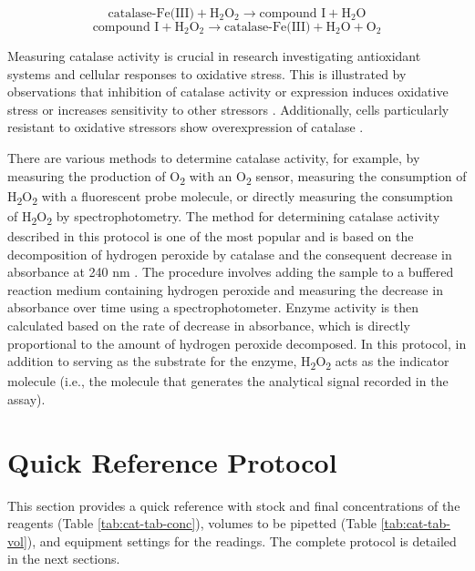 \documentclass[
  9pt,
  american,
  a5paper,
  extrafontsizes,onecolumn,openright
  ]{memoir}
\begin{document}
\[
\text{catalase-Fe(III)} + \text{H}_2\text{O}_2 \rightarrow \text{compound I} + \text{H}_2\text{O}
\]
\[
\text{compound I} + \text{H}_2\text{O}_2 \rightarrow \text{catalase-Fe(III)} + \text{H}_2\text{O} + \text{O}_2
\]

Measuring catalase activity is crucial in research investigating antioxidant systems and cellular responses to oxidative stress. This is illustrated by observations that inhibition of catalase activity or expression induces oxidative stress \autocite{bagnyukova_catalase_2005} or increases sensitivity to other stressors \autocite{ho_mice_2004}. Additionally, cells particularly resistant to oxidative stressors show overexpression of catalase \autocite{spitz_mechanisms_1992}.

There are various methods to determine catalase activity, for example, by measuring the production of O\textsubscript{2} with an O\textsubscript{2} sensor, measuring the consumption of H\textsubscript{2}O\textsubscript{2} with a fluorescent probe molecule, or directly measuring the consumption of H\textsubscript{2}O\textsubscript{2} by spectrophotometry. The method for determining catalase activity described in this protocol is one of the most popular and is based on the decomposition of hydrogen peroxide by catalase and the consequent decrease in absorbance at 240 nm \autocite{aebi_catalase_1984}. The procedure involves adding the sample to a buffered reaction medium containing hydrogen peroxide and measuring the decrease in absorbance over time using a spectrophotometer. Enzyme activity is then calculated based on the rate of decrease in absorbance, which is directly proportional to the amount of hydrogen peroxide decomposed. In this protocol, in addition to serving as the substrate for the enzyme, H\textsubscript{2}O\textsubscript{2} acts as the indicator molecule (i.e., the molecule that generates the analytical signal recorded in the assay).

\newpage

\section{Quick Reference Protocol}\label{cat-quick-ref}

This section provides a quick reference with stock and final concentrations of the reagents (Table \ref{tab:cat-tab-conc}), volumes to be pipetted (Table \ref{tab:cat-tab-vol}), and equipment settings for the readings. The complete protocol is detailed in the next sections.
\end{document}
